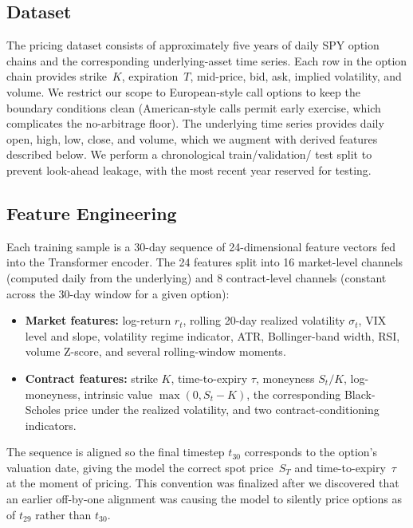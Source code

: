 \documentclass[conference]{IEEEtran}
\begin{document}
\subsection{Dataset}

The pricing dataset consists of approximately five years of
daily SPY option chains and the corresponding underlying-asset
time series. Each row in the option chain provides strike~$K$,
expiration~$T$, mid-price, bid, ask, implied volatility, and
volume. We restrict our scope to European-style call options
to keep the boundary conditions clean (American-style calls
permit early exercise, which complicates the no-arbitrage
floor). The underlying time series provides daily open, high,
low, close, and volume, which we augment with derived features
described below. We perform a chronological train/validation/
test split to prevent look-ahead leakage, with the most recent
year reserved for testing.

\subsection{Feature Engineering}

Each training sample is a 30-day sequence of 24-dimensional
feature vectors fed into the Transformer encoder. The 24
features split into 16 market-level channels (computed daily
from the underlying) and 8 contract-level channels (constant
across the 30-day window for a given option):

\begin{itemize}
\item \textbf{Market features:} log-return $r_t$, rolling
20-day realized volatility $\sigma_t$, VIX level and slope,
volatility regime indicator, ATR, Bollinger-band width, RSI,
volume Z-score, and several rolling-window moments.
\item \textbf{Contract features:} strike $K$, time-to-expiry
$\tau$, moneyness $S_t/K$, log-moneyness, intrinsic value
$\max(0, S_t - K)$, the corresponding Black-Scholes price
under the realized volatility, and two contract-conditioning
indicators.
\end{itemize}

The sequence is aligned so the final timestep $t_{30}$
corresponds to the option's valuation date, giving the model
the correct spot price~$S_T$ and time-to-expiry~$\tau$ at the
moment of pricing. This convention was finalized after we
discovered that an earlier off-by-one alignment was causing
the model to silently price options as of $t_{29}$ rather
than $t_{30}$.
\end{document}
